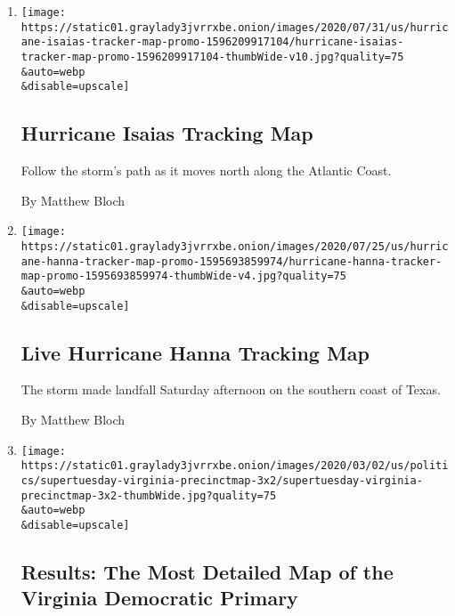\begin{enumerate}
\def\labelenumi{\arabic{enumi}.}
\item
  \href{/interactive/2020/07/31/us/hurricane-isaias-tracker-map.html}{}

  \texttt{[image: https://static01.graylady3jvrrxbe.onion/images/2020/07/31/us/hurricane-isaias-tracker-map-promo-1596209917104/hurricane-isaias-tracker-map-promo-1596209917104-thumbWide-v10.jpg?quality=75\\\&auto=webp\\\&disable=upscale]}

  \hypertarget{hurricane-isaias-tracking-map}{%
  \subsection{Hurricane Isaias Tracking
  Map}\label{hurricane-isaias-tracking-map}}

  Follow the storm's path as it moves north along the Atlantic Coast.

  By Matthew Bloch
\item
  \href{/interactive/2020/07/25/us/hurricane-hanna-tracker-map.html}{}

  \texttt{[image: https://static01.graylady3jvrrxbe.onion/images/2020/07/25/us/hurricane-hanna-tracker-map-promo-1595693859974/hurricane-hanna-tracker-map-promo-1595693859974-thumbWide-v4.jpg?quality=75\\\&auto=webp\\\&disable=upscale]}

  \hypertarget{live-hurricane-hanna-tracking-map}{%
  \subsection{Live Hurricane Hanna Tracking
  Map}\label{live-hurricane-hanna-tracking-map}}

  The storm made landfall Saturday afternoon on the southern coast of
  Texas.

  By Matthew Bloch
\item
  \href{/interactive/2020/03/03/us/elections/precinct-map-virginia-primary.html}{}

  \texttt{[image: https://static01.graylady3jvrrxbe.onion/images/2020/03/02/us/politics/supertuesday-virginia-precinctmap-3x2/supertuesday-virginia-precinctmap-3x2-thumbWide.jpg?quality=75\\\&auto=webp\\\&disable=upscale]}

  \hypertarget{results-the-most-detailed-map-of-the-virginia-democratic-primary}{%
  \subsection{Results: The Most Detailed Map of the Virginia Democratic
  Primary}\label{results-the-most-detailed-map-of-the-virginia-democratic-primary}}


\end{enumerate}
